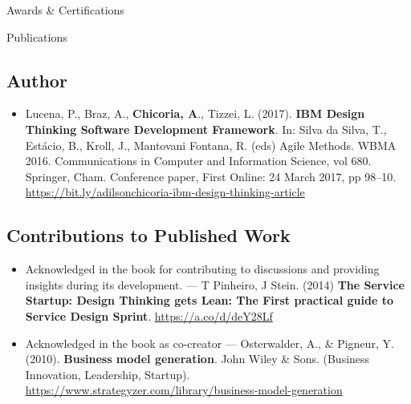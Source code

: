 \documentclass{resume} %
\begin{document}
\begin{rSection}{Awards \& Certifications}
\begin{rSection}{Publications}
\subsection*{Author}
\begin{itemize}
    \item Lucena, P., Braz, A., \textbf{Chicoria, A}., Tizzei, L. (2017). \textbf{IBM Design Thinking Software Development Framework}. In: Silva da Silva, T., Estácio, B., Kroll, J., Mantovani Fontana, R. (eds) Agile Methods. WBMA 2016. Communications in Computer and Information Science, vol 680. Springer, Cham. Conference paper, First Online: 24 March 2017, pp 98–10. \url{https://bit.ly/adilsonchicoria-ibm-design-thinking-article}
\end{itemize}

\subsection*{Contributions to Published Work}
\begin{itemize}
    \item Acknowledged in the book for contributing to discussions and providing insights during its development. — T Pinheiro, J Stein. (2014) \textbf{The Service Startup: Design Thinking gets Lean: The First practical guide to Service Design Sprint}. \href{https://a.co/d/deY28Lf}{https://a.co/d/deY28Lf}
    \item Acknowledged in the book as co-creator — Osterwalder, A., \& Pigneur, Y. (2010). \textbf{Business model generation}. John Wiley \& Sons. (Business Innovation, Leadership, Startup). \href{https://www.strategyzer.com/library/business-model-generation}{https://www.strategyzer.com/library/business-model-generation}

\end{itemize}
\end{rSection}


\end{rSection}
\end{document}
